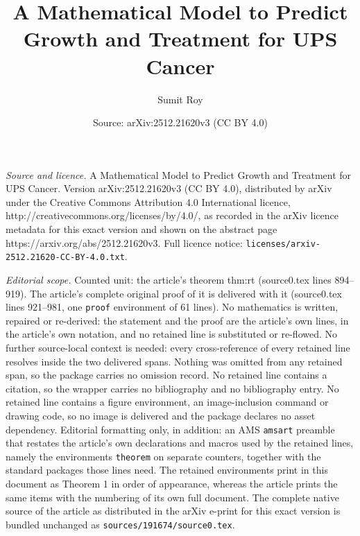 \documentclass[10pt,a4paper]{amsart}
\title{A Mathematical Model to Predict Growth and Treatment for UPS Cancer}
\author{Sumit Roy}
\date{Source: arXiv:2512.21620v3 (CC BY 4.0)}
\begin{document}
\maketitle

\noindent\emph{Source and licence.} A Mathematical Model to Predict Growth and Treatment for UPS Cancer. Version arXiv:2512.21620v3 (CC BY 4.0), distributed by arXiv under the Creative Commons Attribution 4.0 International licence, http://creativecommons.org/licenses/by/4.0/, as recorded in the arXiv licence metadata for this exact version and shown on the abstract page https://arxiv.org/abs/2512.21620v3. Full licence notice: \texttt{licenses/arxiv-2512.21620-CC-BY-4.0.txt}.\par\smallskip

\noindent\textit{Editorial scope.} Counted unit: the article's theorem thm:rt (source0.tex lines 894--919). The article's complete original proof of it is delivered with it (source0.tex lines 921--981, one \texttt{proof} environment of 61 lines). No mathematics is written, repaired or re-derived: the statement and the proof are the article's own lines, in the article's own notation, and no retained line is substituted or re-flowed.  No further source-local context is needed: every cross-reference of every retained line resolves inside the two delivered spans.  Nothing was omitted from any retained span, so the package carries no omission record.  No retained line contains a citation, so the wrapper carries no bibliography and no bibliography entry.  No retained line contains a figure environment, an image-inclusion command or drawing code, so no image is delivered and the package declares no asset dependency.  Editorial formatting only, in addition: an AMS \texttt{amsart} preamble that restates the article's own declarations and macros used by the retained lines, namely the environments \texttt{theorem} on separate counters, together with the standard packages those lines need.  The retained environments print in this document as Theorem 1 in order of appearance, whereas the article prints the same items with the numbering of its own full document.  The complete native source of the article as distributed in the arXiv e-print for this exact version is bundled unchanged as \texttt{sources/191674/source0.tex}.
\end{document}
